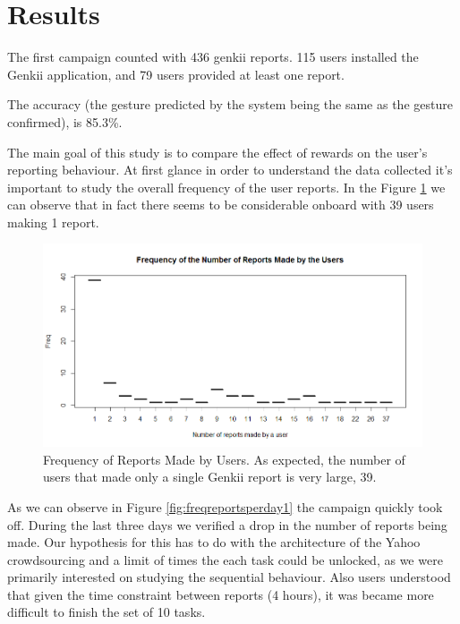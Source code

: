 \documentclass[letterpaper]{article}
\begin{document}
\section{Results}

The first campaign counted with 436 genkii reports.
115 users installed the Genkii application, and 79 users provided at least one report.
 
The accuracy (the gesture predicted by the system being the same as the gesture confirmed), is 85.3\%.

The main goal of this study is to compare the effect of rewards on the user's reporting behaviour.
At first glance in order to understand the data collected it's important to study the overall frequency of the user reports. In the Figure \ref{fig:freqreports1} we can observe that in fact there seems to be considerable onboard with 39 users making 1 report.

\begin{figure}[htb]
	\begin{center}
		\includegraphics[width=1\linewidth]{images/FReports}
		\caption{Frequency of Reports Made by Users. As expected, the number of users that made only a single Genkii report is very large, 39.\label{fig:freqreports1}}
	\end{center}
\end{figure}

As we can observe in Figure \ref{fig:freqreportsperday1} the campaign quickly took off. During the last three days we verified a drop in the number of reports being made. Our hypothesis for this has to do with the architecture of the Yahoo crowdsourcing and a limit of times the each task could be unlocked, as we were primarily interested on studying the sequential behaviour. Also users understood that given the time constraint between reports (4 hours), it was became more difficult to finish the set of 10 tasks.
\end{document}
